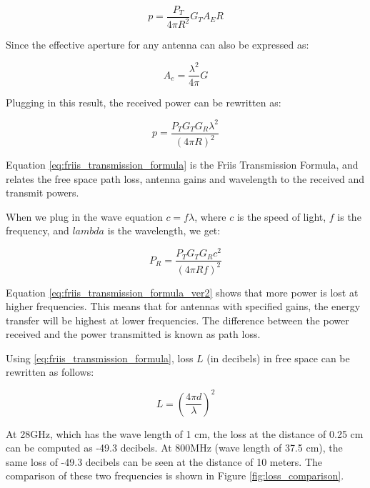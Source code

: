 \documentclass[a4paper,12pt]{report}
\begin{document}
\begin{equation}
  p = \frac{P_T}{4\pi R^2} G_T A_ER
\end{equation}

Since the effective aperture for any antenna can also be expressed as:

\begin{equation}
  A_e = \frac{\lambda ^ 2}{4 \pi} G
\end{equation}

Plugging in this result, the received power can be rewritten as:

\begin{equation} \label{eq:friis_transmission_formula}
  p = \frac{P_T G_T G_R \lambda^2}{(4\pi R)^2}
\end{equation}

Equation \ref{eq:friis_transmission_formula} is the
Friis Transmission Formula, and relates the free space path loss,
antenna gains and wavelength to the received and transmit powers.

When we plug in the wave equation $c = f\lambda$,
where $c$ is the speed of light, $f$ is the frequency,
and $lambda$ is the wavelength, we get:

\begin{equation} \label{eq:friis_transmission_formula_ver2}
  P_R = \frac{P_T G_T G_R c^2}{(4\pi R f)^2}
\end{equation}

Equation \ref{eq:friis_transmission_formula_ver2}
shows that more power is lost at higher frequencies.
This means that for antennas with specified gains,
the energy transfer will be highest at lower frequencies.
The difference between the power received and
the power transmitted is known as path loss.

Using \ref{eq:friis_transmission_formula},
loss $L$ (in decibels) in free space can be rewritten as follows:

\begin{equation}
  L = \left(\frac{4\pi d}{\lambda} \right)^2
\end{equation}

At 28GHz, which has the wave length of 1 cm,
the loss at the distance of 0.25 cm can be computed as -49.3 decibels.
At 800MHz (wave length of 37.5 cm), the same loss of -49.3 decibels can be seen at
the distance of 10 meters.
The comparison of these two frequencies is shown in Figure \ref{fig:loss_comparison}.
\end{document}
